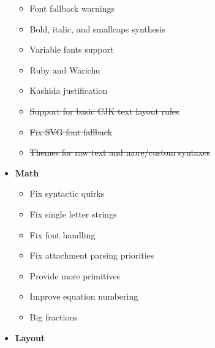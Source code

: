 \begin{itemize}
  \begin{itemize}
  \tightlist
  \item
    Font fallback warnings
  \item
    Bold, italic, and smallcaps synthesis
  \item
    Variable fonts support
  \item
    Ruby and Warichu
  \item
    Kashida justification
  \item
    \st{Support for basic CJK text layout rules}
  \item
    \st{Fix SVG font fallback}
  \item
    \st{Themes for raw text and more/custom syntaxes}
  \end{itemize}
\item
  \textbf{Math}

  \begin{itemize}
  \tightlist
  \item
    Fix syntactic quirks
  \item
    Fix single letter strings
  \item
    Fix font handling
  \item
    Fix attachment parsing priorities
  \item
    Provide more primitives
  \item
    Improve equation numbering
  \item
    Big fractions
  \end{itemize}
\item
  \textbf{Layout}


\end{itemize}
